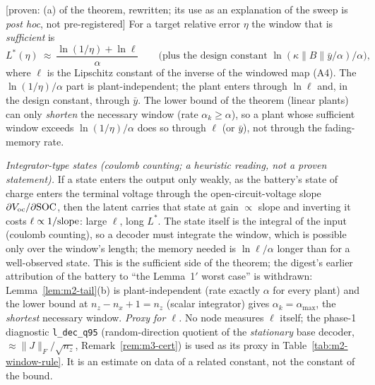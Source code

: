 \begin{corollary}\label{cor:m2-rule}
[proven: (a) of the theorem, rewritten; its use as an explanation of the sweep is \emph{post hoc}, not pre-registered]
For a target relative error $\eta$ the window that is \emph{sufficient} is
\[
 L^*(\eta)\ \approx\ \frac{\ln(1/\eta)+\ln\ell}{\alpha}\qquad\text{(plus the design constant }\ln(\kappa\|B\|\bar y/\alpha)/\alpha\text{)},
\]
where $\ell$ is the Lipschitz constant of the inverse of the windowed map (A4). The $\ln(1/\eta)/\alpha$ part is
plant-independent; the plant enters through $\ln\ell$ and, in the design constant, through $\bar y$. The lower bound of
the theorem (linear plants) can only \emph{shorten} the necessary window (rate $\alpha_k\ge\alpha$), so a plant whose
sufficient window exceeds $\ln(1/\eta)/\alpha$ does so through $\ell$ (or $\bar y$), not through the fading-memory rate.
\end{corollary}
\emph{Integrator-type states (coulomb counting; a heuristic reading, not a proven statement).} If a state enters the output only weakly, as the battery's state of
charge enters the terminal voltage through the open-circuit-voltage slope $\partial V_{\rm oc}/\partial{\rm SOC}$, then
the latent carries that state at gain $\propto$ slope and inverting it costs $\ell\propto1/{\rm slope}$: large
$\ell$, long $L^*$. The state itself is the integral of the input (coulomb counting), so a decoder must integrate the
window, which is possible only over the window's length; the memory needed is $\ln\ell/\alpha$ longer than for a
well-observed state. This is the sufficient side of the theorem; the digest's earlier attribution of the battery to
``the Lemma~1$'$ worst case'' is withdrawn: Lemma~\ref{lem:m2-tail}(b) is plant-independent (rate exactly $\alpha$ for
every plant) and the lower bound at $n_z-n_x+1=n_z$ (scalar integrator) gives $\alpha_k=\alpha_{\max}$, the
\emph{shortest} necessary window. \emph{Proxy for $\ell$.} No node measures $\ell$ itself; the phase-1 diagnostic
\texttt{l\_dec\_q95} (random-direction quotient of the \emph{stationary} base decoder, $\approx\|J\|_F/\sqrt{n_z}$,
Remark~\ref{rem:m3-cert}) is used as its proxy in Table~\ref{tab:m2-window-rule}. It is an estimate on data of a
related constant, not the constant of the bound.

